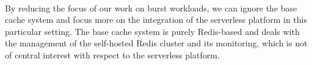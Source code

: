 
~\\
By reducing the focus of our work on burst workloads, we can ignore the base cache system and focus more on the integration of the serverless platform in this particular setting. The base cache system is purely Redis-based and deals with the management of the self-hosted Redis cluster and its monitoring, which is not of central interest with respect to the serverless platform.


